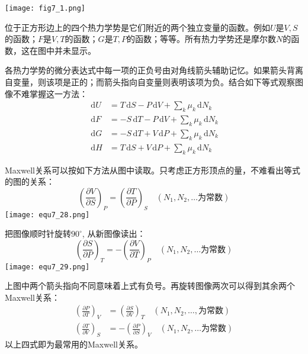 {
	\centering
	\texttt{[image: fig7\_1.png]}
	\label{fig7.1}
}

位于正方形边上的四个热力学势是它们附近的两个独立变量的函数。例如$U$是$V, S$的函数；$F$是$V, T$的函数；$G$是$T, P$的函数；等等。所有热力学势还是摩尔数$N$的函数，这在图中并未显示。

各热力学势的微分表达式中每一项的正负号由对角线箭头辅助记忆。如果箭头背离自变量，则该项是正的；而箭头指向自变量则表明该项为负。结合如下等式观察图像不难掌握这一方法：
\begin{align}
	\,\mathrm dU &= T\,\mathrm dS - P\,\mathrm dV + \sum_k \mu_k \,\mathrm dN_k \label{equ7.24} \\
	\,\mathrm dF &= -S\,\mathrm dT - P\,\mathrm dV + \sum_k \mu_k \,\mathrm dN_k \label{equ7.25} \\
	\,\mathrm dG &= -S\,\mathrm dT + V\,\mathrm dP + \sum_k \mu_k \,\mathrm dN_k  \label{equ7.26} \\
	\,\mathrm dH &= T\,\mathrm dS + V\,\mathrm dP + \sum_k \mu_k \,\mathrm dN_k  \label{equ7.27}
\end{align}

Maxwell关系可以按如下方法从图中读取。只考虑正方形顶点的量，不难看出等式的图的关系：
\begin{equation}
	\left( \frac{\partial V}{\partial S} \right)_P = \left( \frac{\partial T}{\partial P} \right)_S \quad (N_1, N_2, \dots \text{为常数})
\label{equ7.28}
\end{equation}
{
	\centering
	\texttt{[image: equ7\_28.png]}
}

把图像顺时针旋转$90^\circ$, 从新图像读出：
\begin{equation}
	\left( \frac{\partial S}{\partial P} \right)_T = -\left( \frac{\partial V}{\partial T} \right)_P \quad (N_1, N_2, \dots \text{为常数})
\label{equ7.29}
\end{equation}
{
	\centering
	\texttt{[image: equ7\_29.png]}
}

上图中两个箭头指向不同意味着上式有负号。再旋转图像两次可以得到其余两个Maxwell关系：
\begin{align}
	\left( \frac{\partial P}{\partial T} \right)_V &= \left( \frac{\partial S}{\partial V} \right)_T \quad (N_1, N_2, \dots, \text{为常数}) \label{equ7.30}\\
	\left( \frac{\partial T}{\partial V} \right)_S &= - \left( \frac{\partial P}{\partial S} \right)_V \quad (N_1, N_2, \dots \text{为常数}) \label{equ7.31}
\end{align}
以上四式即为最常用的Maxwell关系。

